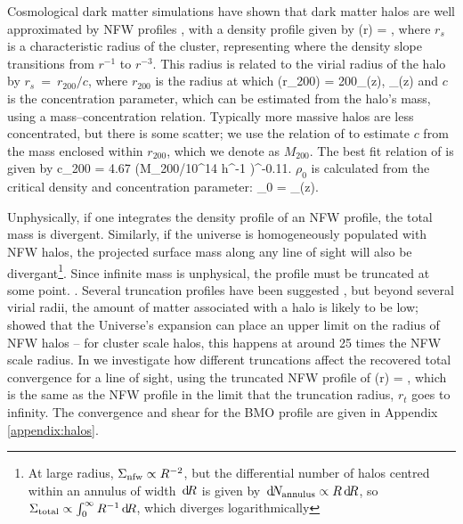 \documentclass[useAMS,usenatbib]{mn2e}
\begin{document}
Cosmological dark matter simulations have shown that dark matter
halos are well approximated by NFW profiles \citep{NFW1997}, with a density
profile given by
\be\label{eq:rhonfw}
\rho(r) = 
,
\ee
where $r_{s}$ is a characteristic radius of the cluster, representing where
the density slope transitions from $r^{-1}$ to $r^{-3}$. This radius is related
to the virial radius of the halo by $r_{s}~=~r_{200}/c$, where $r_{200}$ is the radius at 
which 
\be
\rho(r_{200}) = 200\rho_{{}}(z),  \rho_{}(z) \equiv {}
\ee
and $c$ is the concentration parameter, which can be estimated from the halo's mass,
using a mass--concentration relation. Typically more massive halos are less concentrated,
but there is some scatter; we use the relation of \citet{neto2007} to estimate $c$
from the mass enclosed within $r_{200}$, which we denote as $M_{200}$. The best fit relation of \citet{neto2007} is given by
\be
c_{200} = 4.67 (M_{200}/10^{14} h^{-1} \Msun)^{-0.11}.
\ee
$\rho_0$ is calculated from the critical density and concentration parameter:
\be
\rho_0 = \rho_{}(z).
\ee

Unphysically, if one integrates the density profile of an NFW profile, the total mass is divergent.
Similarly, if the universe is homogeneously populated with NFW halos, the projected surface mass along any
line of sight will also be divergant\footnote{At large radius, $\Sigma_{\rm
nfw} \propto R^{-2}$, but the differential number of halos centred within an
annulus of width $\, \mathrm{d} \! R$ is given by $\, \mathrm{d} \! N_{\rm annulus} \propto R \, \mathrm{d} \! R$,
so  $\Sigma_{\rm total} \propto \int_{0}^{\infty} R^{-1} \, \mathrm{d} \! R$, which
diverges logarithmically}. Since infinite mass is unphysical, the profile must
be truncated at some point. . Several truncation profiles have been suggested \citep[e.g][]{BMO}, but beyond several virial radii, the amount of matter associated with a halo is likely to be low; \citet{Nandra2012} showed that the Universe's expansion can place an upper limit on the radius of NFW halos -- for cluster scale halos, this happens at around 25 times the NFW scale radius. In  we investigate how different truncations affect the recovered total convergence for a line of sight, using the truncated NFW profile of \citet{BMO}
\be\label{eq:bmoprofile}
\rho(r) = 
,
\ee
which is the same as the NFW profile in the limit that the truncation radius, $r_t$ goes to infinity. The convergence and shear for the BMO profile are given in Appendix \ref{appendix:halos}.
\end{document}
